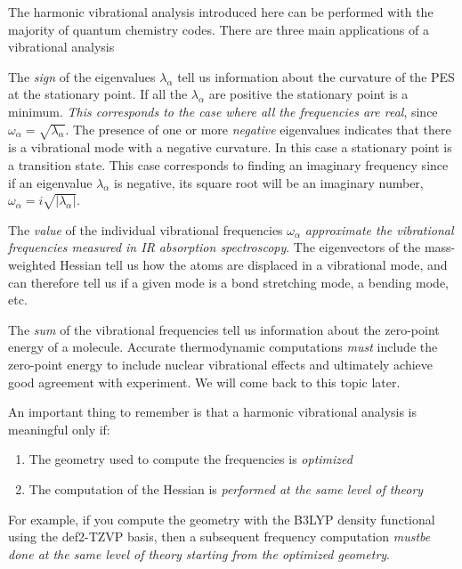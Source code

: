 \documentclass[../Main/notes.tex]{subfiles}
\begin{document}
The harmonic vibrational analysis introduced here can be performed with the majority of quantum chemistry codes.
There are three main applications of a vibrational analysis
\begin{myitems}
\item The \emph{sign} of the eigenvalues $\lambda_\alpha$ tell us information about the curvature of the PES at the stationary point.
If all the $\lambda_\alpha$ are positive the stationary point is a minimum. \emph{This corresponds to the case where all the frequencies are real}, since $\omega_\alpha = \sqrt{\lambda_\alpha}$.
The presence of one or more \emph{negative} eigenvalues indicates that there is a vibrational mode with a negative curvature.
In this case a stationary point is a transition state.
This case corresponds to finding an imaginary frequency since if an eigenvalue $\lambda_\alpha$ is negative, its square root will be an imaginary number, $\omega_\alpha = i \sqrt{|\lambda_\alpha|}$.

\item The \emph{value} of the individual vibrational frequencies $\omega_\alpha$ \emph{approximate the vibrational frequencies measured in IR absorption spectroscopy}.
The eigenvectors of the mass-weighted Hessian tell us how the atoms are displaced in a vibrational mode, and can therefore tell us if a given mode is a bond stretching mode, a bending mode, etc.

\item The \emph{sum} of the vibrational frequencies tell us information about the zero-point energy of a molecule.
Accurate thermodynamic computations \emph{must} include the zero-point energy to include nuclear vibrational effects and ultimately achieve good agreement with experiment. We will come back to this topic later.
\end{myitems}

\begin{ibox}
An important thing to remember is that a harmonic vibrational analysis is meaningful only if:
\begin{enumerate}
\item The geometry used to compute the frequencies is \emph{optimized}
\item The computation of the Hessian is \emph{performed at the same level of theory}
\end{enumerate}
For example, if you compute the geometry with the B3LYP density functional using the def2-TZVP basis, then a subsequent frequency computation \emph{mustbe done at the same level of theory starting from the optimized geometry}.
\end{ibox}
\end{document}
